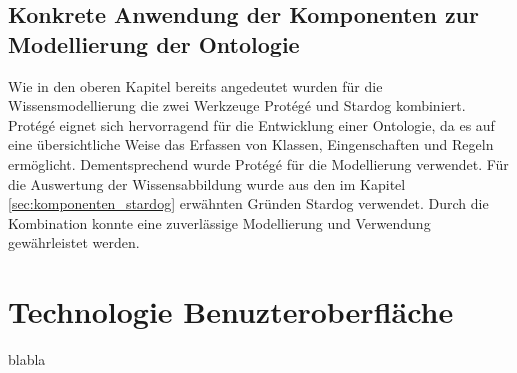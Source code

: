 \subsection{Konkrete Anwendung der Komponenten zur Modellierung der Ontologie}
\label{subsec:komponenten_anwendung}
Wie in den oberen Kapitel bereits angedeutet wurden für die Wissensmodellierung die zwei Werkzeuge Protégé und Stardog kombiniert. Protégé eignet sich hervorragend für die Entwicklung einer Ontologie, da es auf eine übersichtliche Weise das Erfassen von Klassen, Eingenschaften und Regeln ermöglicht. Dementsprechend wurde Protégé für die Modellierung verwendet.
Für die Auswertung der Wissensabbildung wurde aus den im Kapitel \ref{sec:komponenten_stardog} erwähnten Gründen Stardog verwendet. Durch die Kombination konnte eine zuverlässige Modellierung und Verwendung gewährleistet werden. 


\section{Technologie Benuzteroberfläche}
\label{sec:komponenten_ember}
blabla


